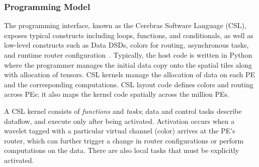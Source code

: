 \documentclass[conference]{IEEEtran}
\begin{document}
            \subsubsection{Programming Model}
                \label{sec:programmingmodel}
                The programming interface, known as the Cerebras Software Language (CSL), exposes typical constructs including loops, functions, and conditionals, as well as low-level constructs such as Data DSDs, %
                colors for routing, asynchronous tasks, and runtime router configuration~\cite{CSL}. Typically, %
                the host code is written in Python where the programmer manages the initial data copy onto the spatial tiles along with allocation of tensors. %
                CSL kernels manage the allocation of data on each PE and the corresponding computations. CSL layout code defines colors and routing across PEs; it also maps the kernel code spatially across the million PEs.

                A CSL kernel consists of \textit{functions} and \textit{tasks}; data and control tasks describe dataflow, and execute only after being activated. %
                Activation occurs when a wavelet tagged with a particular virtual channel (color) arrives at the PE’s router, which can further trigger a change in router configurations or perform computations on the data. %
                There are also local tasks that must be explicitly activated. %
\end{document}
